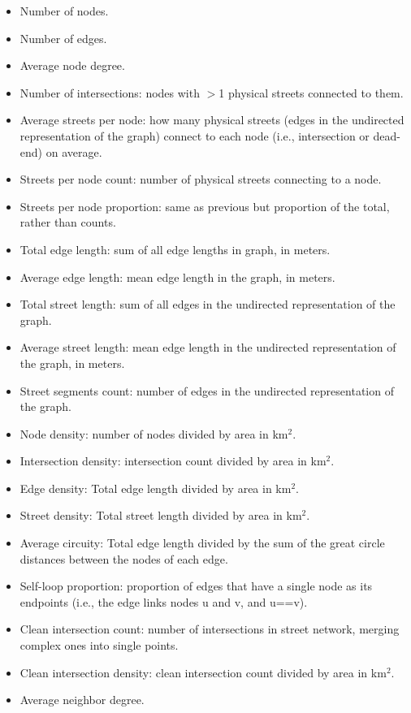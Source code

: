 \begin{itemize}
	\item Number of nodes.
	\item Number of edges.
	\item Average node degree.
	\item Number of intersections: nodes with $>$1 physical streets connected to them.
	\item Average streets per node: how many physical streets (edges in the undirected representation of the graph) connect to each node (i.e., intersection or dead-end) on average.
	\item Streets per node count: number of physical streets connecting to a node.
	\item Streets per node proportion: same as previous but proportion of the total, rather than counts.
	\item Total edge length: sum of all edge lengths in graph, in meters.
	\item Average edge length: mean edge length in the graph, in meters.
	\item Total street length: sum of all edges in the undirected representation of the graph.
	\item Average street length: mean edge length in the undirected representation of the graph, in meters.
	\item Street segments count: number of edges in the undirected representation of the graph.
	\item Node density: number of nodes divided by area in km$^2$.
	\item Intersection density: intersection count divided by area in km$^2$.
	\item Edge density: Total edge length divided by area in km$^2$.
	\item Street density: Total street length divided by area in km$^2$.
	\item Average circuity: Total edge length divided by the sum of the great circle distances between the nodes of each edge.
	\item Self-loop proportion: proportion of edges that have a single node as its endpoints (i.e., the edge links nodes u and v, and u==v).
	\item Clean intersection count: number of intersections in street network, merging complex ones into single points.
	\item Clean intersection density: clean intersection count divided by area in km$^2$.
	\item Average neighbor degree.

\end{itemize}
